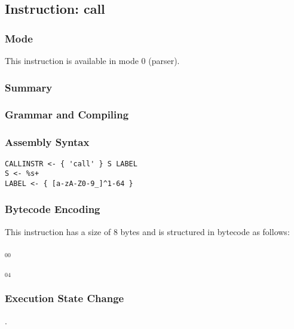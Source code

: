 \subsection{Instruction: call}

\subsubsection{Mode}
This instruction is available in mode 0 (parser).
\subsubsection{Summary}


\subsubsection{Grammar and Compiling}


\subsubsection{Assembly Syntax}

\begin{myquote}
\begin{verbatim}
CALLINSTR <- { 'call' } S LABEL
S <- %s+
LABEL <- { [a-zA-Z0-9_]^1-64 }
\end{verbatim}
\end{myquote}

\subsubsection{Bytecode Encoding}

This instruction has a size of 8 bytes and is structured in bytecode as follows:

$_{00}$\ 



$_{04}$\ 


\subsubsection{Execution State Change}

.


